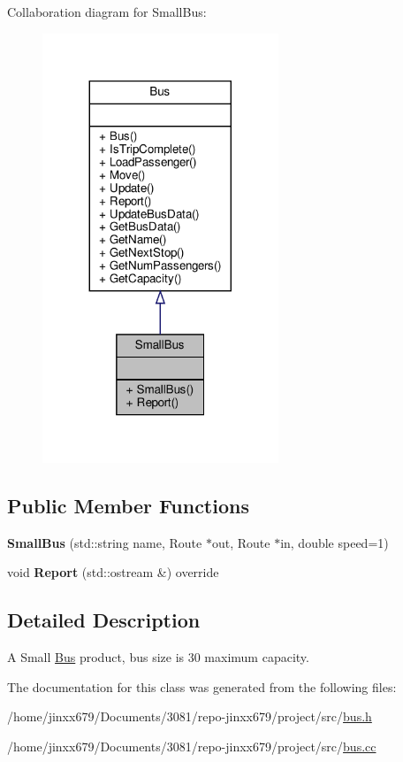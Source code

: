 Collaboration diagram for Small\+Bus\+:\nopagebreak
\begin{figure}[H]
\begin{center}
\leavevmode
\includegraphics[width=200pt]{classSmallBus__coll__graph}
\end{center}
\end{figure}
\subsection*{Public Member Functions}
\begin{DoxyCompactItemize}
\item 
\mbox{\label{classSmallBus_a44623f798fe5ca47c6cf2ffa1276e92e}} 
{\bfseries Small\+Bus} (std\+::string name, Route $\ast$out, Route $\ast$in, double speed=1)
\item 
\mbox{\label{classSmallBus_a5759f6dd8c3738962730b6f0e28a9c05}} 
void {\bfseries Report} (std\+::ostream \&) override
\end{DoxyCompactItemize}


\subsection{Detailed Description}
A Small \hyperlink{classBus}{Bus} product, bus size is 30 maximum capacity. 

The documentation for this class was generated from the following files\+:\begin{DoxyCompactItemize}
\item 
/home/jinxx679/\+Documents/3081/repo-\/jinxx679/project/src/\hyperlink{bus_8h}{bus.\+h}\item 
/home/jinxx679/\+Documents/3081/repo-\/jinxx679/project/src/\hyperlink{bus_8cc}{bus.\+cc}\end{DoxyCompactItemize}
